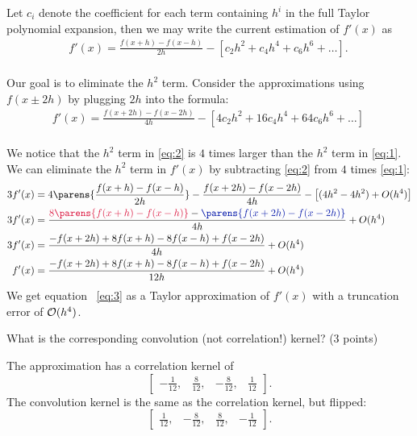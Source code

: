 \begin{problem}
\begin{enumroman}
      \begin{Answer}
        Let $c_i$ denote the coefficient for each term containing $h^i$ in the
        full Taylor polynomial expansion, then we may  write the current estimation of
        $f'(x)$ as
        \begin{align}
          f'(x) = \frac{f(x+h) - f(x-h)}{2h} - \left[ c_2 h^2 + c_4 h^4 + c_6 h^6 + \ldots \right].~\label{eq:1}
        \end{align}
        \\
        Our goal is to eliminate the $h^2$ term.
        Consider the approximations using $f(x \pm 2h)$ by plugging $2h$ into the formula:
        \begin{align}
          f'(x) = \frac{f(x+2h) - f(x-2h)}{4h} - \left[ 4c_2 h^2 + 16 c_4 h^4 + 64 c_6h^6 + \ldots \right]~\label{eq:2}
        \end{align}
        \\
        We notice that the $h^2$ term in \ref{eq:2} is $4$ times larger than the $h^2$ term in \ref{eq:1}.
        We can eliminate the $h^2$ term in $f'(x)$ by subtracting \ref{eq:2} from $4$ times \ref{eq:1}:
        \begin{align}
          3f'(x) &= 4 \parens{\frac{f(x+h) - f(x-h)}{2h}} - \frac{f(x+2h) - f(x-2h)}{4h} - \left[ (4h^2 - 4h^2) + O(h^4) \right] \nonumber \\
          3f'(x) &= \frac{\crim{8\parens{f(x+h) - f(x-h)}} - \zaff{\parens{f(x+2h) - f(x-2h)}}}{4h} + O(h^4 \nonumber) \\
          3f'(x) &= \frac{-f(x+2h) + 8f(x+h) -8f(x-h) + f(x-2h)}{4h} + O(h^4 \nonumber) \\
          f'(x) &= \frac{-f(x+2h) + 8f(x+h) -8f(x-h) + f(x-2h)}{12h} + O(h^4) ~\label{eq:3}
        \end{align}
        We get equation ~\ref{eq:3} as a Taylor approximation of $f'(x)$ with a truncation error
        of $\mathcal{O}(h^4)$.  
      \end{Answer}
    \newpage
    \item What is the corresponding convolution (not correlation!) kernel? (3 points)
    \begin{Answer}
      The approximation has a correlation kernel of
      \[
        \begin{bmatrix}
          -\frac{1}{12}, & \frac{8}{12}, & -\frac{8}{12}, & \frac{1}{12}
        \end{bmatrix}.
      \]
      The convolution kernel is the same as the correlation kernel, but flipped:
      \[
        \begin{bmatrix}
          \frac{1}{12}, & -\frac{8}{12}, & \frac{8}{12}, & -\frac{1}{12}
        \end{bmatrix}.  
      \]
    \end{Answer}
  \end{enumroman}
\end{problem}
